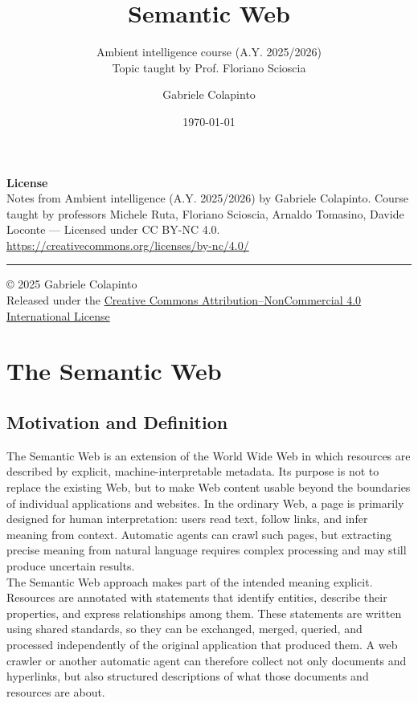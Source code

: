 \documentclass{scrbook}
\title{Semantic Web}
\subtitle{Ambient intelligence course (A.Y. 2025/2026)\\Topic taught by Prof. Floriano Scioscia}
\author{Gabriele Colapinto}
\date{\today}
\begin{document}
	
	\maketitle
	\thispagestyle{empty}
	
	{\Large\textbf{License}} \\
	{Notes from Ambient intelligence (A.Y. 2025/2026) by Gabriele Colapinto. 
		Course taught by professors Michele Ruta, Floriano Scioscia, Arnaldo Tomasino, Davide Loconte — 
		Licensed under CC BY-NC 4.0.\\
		\url{https://creativecommons.org/licenses/by-nc/4.0/}}
	
	\vspace*{\fill}
	\rule{\textwidth}{0.2pt}
	\small{© 2025 Gabriele Colapinto \\
		Released under the \href{https://creativecommons.org/licenses/by-nc/4.0/}{Creative Commons Attribution–NonCommercial 4.0 International License}}
	
	\clearpage
	
	\tableofcontents

	\chapter{The Semantic Web}
	
	\section{Motivation and Definition}
	
	The Semantic Web is an extension of the World Wide Web in which resources are described by explicit, machine-interpretable metadata. Its purpose is not to replace the existing Web, but to make Web content usable beyond the boundaries of individual applications and websites. In the ordinary Web, a page is primarily designed for human interpretation: users read text, follow links, and infer meaning from context. Automatic agents can crawl such pages, but extracting precise meaning from natural language requires complex processing and may still produce uncertain results.\\
	
	The Semantic Web approach makes part of the intended meaning explicit. Resources are annotated with statements that identify entities, describe their properties, and express relationships among them. These statements are written using shared standards, so they can be exchanged, merged, queried, and processed independently of the original application that produced them. A web crawler or another automatic agent can therefore collect not only documents and hyperlinks, but also structured descriptions of what those documents and resources are about.\\
	
\end{document}
